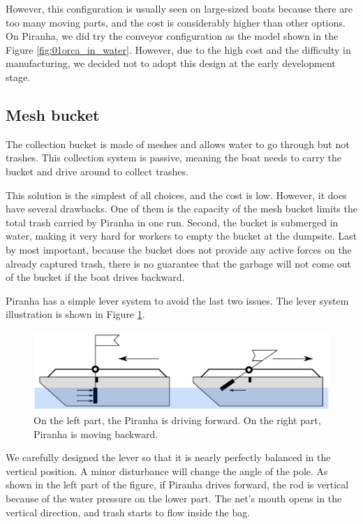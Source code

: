 However, this configuration is usually seen on large-sized boats because there are too many moving parts, and the cost is considerably higher than other options. On Piranha, we did try the conveyor configuration as the model shown in the Figure \ref{fig:01orca_in_water}. However, due to the high cost and the difficulty in manufacturing, we decided not to adopt this design at the early development stage.

\subsection{Mesh bucket}

The collection bucket is made of meshes and allows water to go through but not trashes. This collection system is passive, meaning the boat needs to carry the bucket and drive around to collect trashes.

This solution is the simplest of all choices, and the cost is low. However, it does have several drawbacks. One of them is the capacity of the mesh bucket limits the total trash carried by Piranha in one run. Second, the bucket is submerged in water, making it very hard for workers to empty the bucket at the dumpsite. Last by most important, because the bucket does not provide any active forces on the already captured trash, there is no guarantee that the garbage will not come out of the bucket if the boat drives backward.

Piranha has a simple lever system to avoid the last two issues. The lever system illustration is shown in Figure \ref{fig:01lever-net}.

\begin{figure}[H]
    \centering
    \includegraphics[width=.8\textwidth]{images/01lever-net.png}
    \caption{On the left part, the Piranha is driving forward. On the right part, Piranha is moving backward.}
    \label{fig:01lever-net}
\end{figure}

We carefully designed the lever so that it is nearly perfectly balanced in the vertical position. A minor disturbance will change the angle of the pole. As shown in the left part of the figure, if Piranha drives forward, the rod is vertical because of the water pressure on the lower part. The net's mouth opens in the vertical direction, and trash starts to flow inside the bag.


